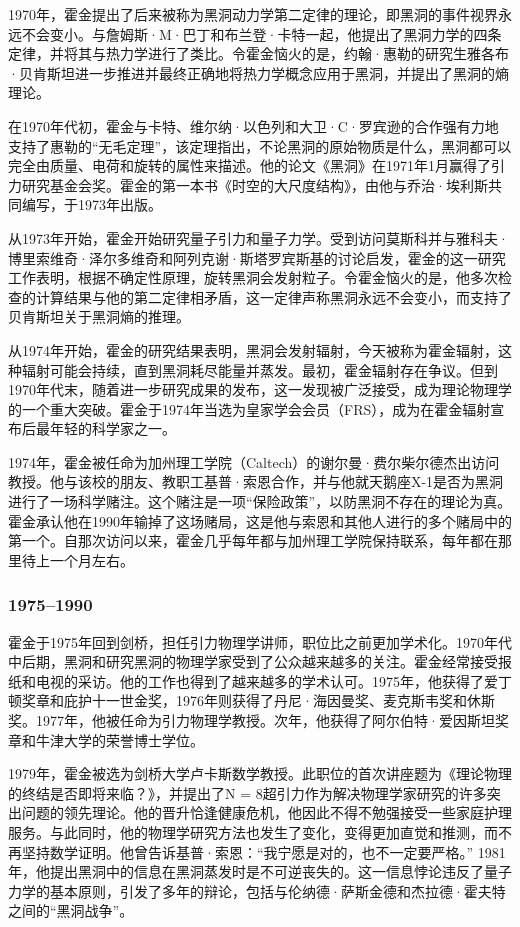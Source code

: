 1970年，霍金提出了后来被称为黑洞动力学第二定律的理论，即黑洞的事件视界永远不会变小。与詹姆斯·M·巴丁和布兰登·卡特一起，他提出了黑洞力学的四条定律，并将其与热力学进行了类比。令霍金恼火的是，约翰·惠勒的研究生雅各布·贝肯斯坦进一步推进并最终正确地将热力学概念应用于黑洞，并提出了黑洞的熵理论。

在1970年代初，霍金与卡特、维尔纳·以色列和大卫·C·罗宾逊的合作强有力地支持了惠勒的“无毛定理”，该定理指出，不论黑洞的原始物质是什么，黑洞都可以完全由质量、电荷和旋转的属性来描述。他的论文《黑洞》在1971年1月赢得了引力研究基金会奖。霍金的第一本书《时空的大尺度结构》，由他与乔治·埃利斯共同编写，于1973年出版。

从1973年开始，霍金开始研究量子引力和量子力学。受到访问莫斯科并与雅科夫·博里索维奇·泽尔多维奇和阿列克谢·斯塔罗宾斯基的讨论启发，霍金的这一研究工作表明，根据不确定性原理，旋转黑洞会发射粒子。令霍金恼火的是，他多次检查的计算结果与他的第二定律相矛盾，这一定律声称黑洞永远不会变小，而支持了贝肯斯坦关于黑洞熵的推理。

从1974年开始，霍金的研究结果表明，黑洞会发射辐射，今天被称为霍金辐射，这种辐射可能会持续，直到黑洞耗尽能量并蒸发。最初，霍金辐射存在争议。但到1970年代末，随着进一步研究成果的发布，这一发现被广泛接受，成为理论物理学的一个重大突破。霍金于1974年当选为皇家学会会员（FRS），成为在霍金辐射宣布后最年轻的科学家之一。

1974年，霍金被任命为加州理工学院（Caltech）的谢尔曼·费尔柴尔德杰出访问教授。他与该校的朋友、教职工基普·索恩合作，并与他就天鹅座X-1是否为黑洞进行了一场科学赌注。这个赌注是一项“保险政策”，以防黑洞不存在的理论为真。霍金承认他在1990年输掉了这场赌局，这是他与索恩和其他人进行的多个赌局中的第一个。自那次访问以来，霍金几乎每年都与加州理工学院保持联系，每年都在那里待上一个月左右。
\subsubsection{1975–1990}
霍金于1975年回到剑桥，担任引力物理学讲师，职位比之前更加学术化。1970年代中后期，黑洞和研究黑洞的物理学家受到了公众越来越多的关注。霍金经常接受报纸和电视的采访。他的工作也得到了越来越多的学术认可。1975年，他获得了爱丁顿奖章和庇护十一世金奖，1976年则获得了丹尼·海因曼奖、麦克斯韦奖和休斯奖。1977年，他被任命为引力物理学教授。次年，他获得了阿尔伯特·爱因斯坦奖章和牛津大学的荣誉博士学位。

1979年，霍金被选为剑桥大学卢卡斯数学教授。此职位的首次讲座题为《理论物理的终结是否即将来临？》，并提出了N = 8超引力作为解决物理学家研究的许多突出问题的领先理论。他的晋升恰逢健康危机，他因此不得不勉强接受一些家庭护理服务。与此同时，他的物理学研究方法也发生了变化，变得更加直觉和推测，而不再坚持数学证明。他曾告诉基普·索恩：“我宁愿是对的，也不一定要严格。”
1981年，他提出黑洞中的信息在黑洞蒸发时是不可逆丧失的。这一信息悖论违反了量子力学的基本原则，引发了多年的辩论，包括与伦纳德·萨斯金德和杰拉德·霍夫特之间的“黑洞战争”。


